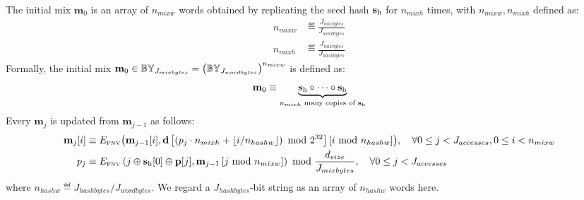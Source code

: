 The initial mix $\mathbf{m}_0$ is an array of $n_{mixw}$ words 
obtained by replicating the seed hash $\mathbf{s}_{\mathrm{h}}$ for $n_{mixh}$ times, 
with $n_{mixw},n_{mixh}$ defined as:
\begin{align}
	n_{mixw}& \eqdef  \frac{J_{mixbytes}}{J_{wordbytes}}\\
	n_{mixh}& \eqdef  \frac{J_{mixbytes}}{J_{hashbytes}}
\end{align}
Formally, the initial mix 
$\mathbf{m}_0 \in \mathbb{BY}_{J_{mixbytes}}
=\left(\mathbb{BY}_{J_{wordbytes}}\right)^{n_{mixw}}$ is defined as:
\begin{equation}
	\mathbf{m}_0 \equiv \underbrace{\mathbf{s}_{\mathrm{h}} \circ \cdots \circ \mathbf{s}_{\mathrm{h}}}_{\text{$n_{mixh}$ many copies of $\mathbf{s}_{\mathrm{h}}$}}
\end{equation}
%
Every $\mathbf{m}_j$ is updated from $\mathbf{m}_{j-1}$ as follows:
\begin{align}
 \mathbf{m}_j[i] &\equiv 
	E_\text{\tiny FNV}\big(
		\mathbf{m}_{j-1}[i], 
		\mathbf{d}\left[
			\left(p_j\cdot n_{mixh} +\lfloor i/n_{hashw}\rfloor \right) \mbox{ mod } 2^{32}
		\right][i\mbox{ mod } n_{hashw}]
	\big), \quad \forall 0\le j<J_{accesses},0\le i< n_{mixw}\\ 
 {p}_j &\equiv 
	E_\text{\tiny FNV}\left(j \oplus \mathbf{s}_{\mathrm{h}}[0] \oplus \mathbf{p}[j], \mathbf{m}_{j-1}\left[j \mbox{ mod } n_{mixw}\right]\right) \mbox{ mod } \frac{d_{size}}{J_{mixbytes}}, \quad \forall 0\le j<J_{accesses}
\end{align}
where $n_{hashw}\eqdef J_{hashbytes}/J_{wordbytes}$. We regard a $J_{hashbytes}$-bit string as an array of $n_{hashw}$ words here. 

